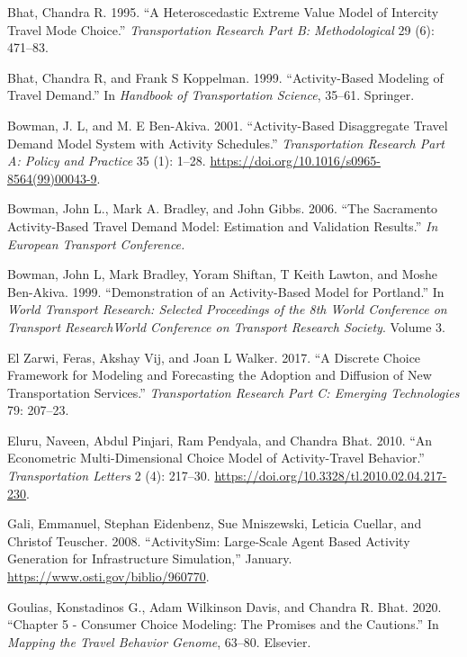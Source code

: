 \documentclass[12pt, oneside, openright]{byuthesis}
\newlength{\cslhangindent}
\newlength{\cslentryspacingunit} %
\newenvironment{CSLReferences}[2] %
 {%
  \setlength{\parindent}{0pt}
  \ifodd #1
  \let\oldpar\par
  \def\par{\hangindent=\cslhangindent\oldpar}
  \fi
  \setlength{\parskip}{#2\cslentryspacingunit}
 }%
 {}
\begin{document}
\begin{CSLReferences}{1}{0}
\leavevmode{}%
Bhat, Chandra R. 1995. {``A Heteroscedastic Extreme Value Model of Intercity Travel Mode Choice.''} \emph{Transportation Research Part B: Methodological} 29 (6): 471--83.

\leavevmode{}%
Bhat, Chandra R, and Frank S Koppelman. 1999. {``Activity-Based Modeling of Travel Demand.''} In \emph{Handbook of Transportation Science}, 35--61. Springer.

\leavevmode{}%
Bowman, J. L, and M. E Ben-Akiva. 2001. {``Activity-Based Disaggregate Travel Demand Model System with Activity Schedules.''} \emph{Transportation Research Part A: Policy and Practice} 35 (1): 1--28. \url{https://doi.org/10.1016/s0965-8564(99)00043-9}.

\leavevmode{}%
Bowman, John L., Mark A. Bradley, and John Gibbs. 2006. {``The Sacramento Activity-Based Travel Demand Model: Estimation and Validation Results.''} \emph{In European Transport Conference.}

\leavevmode{}%
Bowman, John L, Mark Bradley, Yoram Shiftan, T Keith Lawton, and Moshe Ben-Akiva. 1999. {``Demonstration of an Activity-Based Model for Portland.''} In \emph{World Transport Research: Selected Proceedings of the 8th World Conference on Transport ResearchWorld Conference on Transport Research Society}. Volume 3.

\leavevmode{}%
El Zarwi, Feras, Akshay Vij, and Joan L Walker. 2017. {``A Discrete Choice Framework for Modeling and Forecasting the Adoption and Diffusion of New Transportation Services.''} \emph{Transportation Research Part C: Emerging Technologies} 79: 207--23.

\leavevmode{}%
Eluru, Naveen, Abdul Pinjari, Ram Pendyala, and Chandra Bhat. 2010. {``An Econometric Multi-Dimensional Choice Model of Activity-Travel Behavior.''} \emph{Transportation Letters} 2 (4): 217--30. \url{https://doi.org/10.3328/tl.2010.02.04.217-230}.

\leavevmode{}%
Gali, Emmanuel, Stephan Eidenbenz, Sue Mniszewski, Leticia Cuellar, and Christof Teuscher. 2008. {``ActivitySim: Large-Scale Agent Based Activity Generation for Infrastructure Simulation,''} January. \url{https://www.osti.gov/biblio/960770}.

\leavevmode{}%
Goulias, Konstadinos G., Adam Wilkinson Davis, and Chandra R. Bhat. 2020. {``Chapter 5 - Consumer Choice Modeling: The Promises and the Cautions.''} In \emph{Mapping the Travel Behavior Genome}, 63--80. Elsevier.


\end{CSLReferences}
\end{document}

